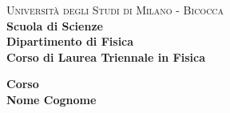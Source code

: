  \begin{titlepage}
		\noindent
		\begin{minipage}[t]{0.19\textwidth}
		\end{minipage}
		\begin{minipage}[t]{0.81\textwidth}
			{
				{\textsc{Università degli Studi di Milano - Bicocca}} \\
				\textbf{Scuola di Scienze} \\
				\textbf{Dipartimento di Fisica} \\
				\textbf{Corso di Laurea Triennale in Fisica} \\
				\par
			}
		\end{minipage}
	
		\vspace{60mm}
		
		\begin{center}
			{\LARGE{
					\textbf{Corso \\ Nome Cognome}
					\par
			}}
		\end{center}
		
	    \vspace{50mm}
\end{titlepage}